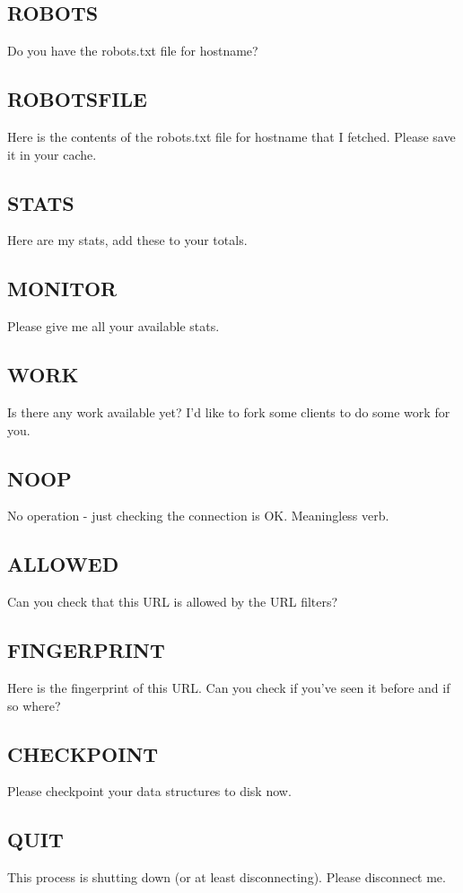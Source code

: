 \subsection{ROBOTS}
Do you have the robots.txt file for hostname?

\subsection{ROBOTSFILE}
Here is the contents of the robots.txt file for hostname that I fetched. Please save it in your cache.

\subsection{STATS}
Here are my stats, add these to your totals.

\subsection{MONITOR}
Please give me all your available stats.

\subsection{WORK}
Is there any work available yet? I'd like to fork some clients to do some work for you.

\subsection{NOOP}
No operation - just checking the connection is OK. Meaningless verb.

\subsection{ALLOWED}
Can you check that this URL is allowed by the URL filters?

\subsection{FINGERPRINT}
Here is the fingerprint of this URL. Can you check if you've seen it before and if so where?

\subsection{CHECKPOINT}
Please checkpoint your data structures to disk now.

\subsection{QUIT}
This process is shutting down (or at least disconnecting). Please disconnect me.
